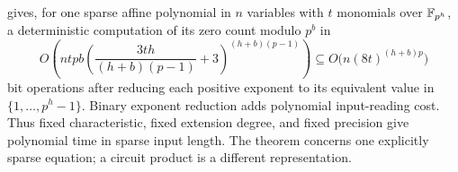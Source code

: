 \citet[Theorem 1.1, p. 3 of the author manuscript]{core-wan} gives, for one sparse affine polynomial in $n$ variables with $t$ monomials over $\mathbb F_{p^h}$, a deterministic computation of its zero count modulo $p^b$ in
\[
O\!\left(ntpb\left(\frac{3th}{(h+b)(p-1)}+3\right)^{(h+b)(p-1)}\right)
\subseteq O\bigl(n(8t)^{(h+b)p}\bigr)
\]
bit operations after reducing each positive exponent to its equivalent value in $\{1,\ldots,p^h-1\}$. Binary exponent reduction adds polynomial input-reading cost. Thus fixed characteristic, fixed extension degree, and fixed precision give polynomial time in sparse input length. The theorem concerns one explicitly sparse equation; a circuit product is a different representation.
